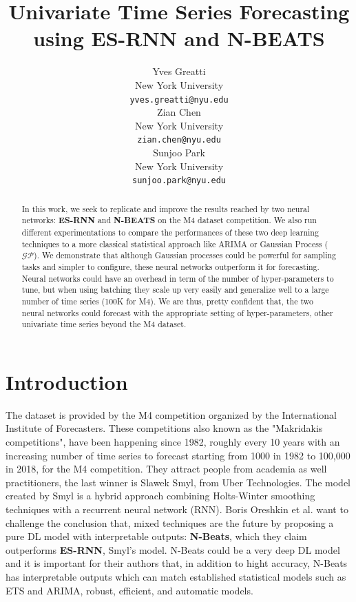 \documentclass{article}
\title{Univariate Time Series Forecasting using ES-RNN and N-BEATS}
\author{%
  Yves Greatti \\
  New York University\\
  \texttt{yves.greatti@nyu.edu} \\
   \And
    Zian Chen \\
    New York University\\
    \texttt{zian.chen@nyu.edu} \\
    \And 
   Sunjoo Park\\
    New York University\\
    \texttt{sunjoo.park@nyu.edu}
}
\begin{document}
\maketitle

\begin{abstract}
  In this work, we seek to replicate and improve the results reached by two neural networks: \textbf{ES-RNN} and \textbf{N-BEATS} on the M4 dataset competition.
  We also run different experimentations to compare the performances of these two deep learning techniques to a more classical statistical approach like ARIMA or Gaussian Process ($\mathcal{GP}$).
  We demonstrate that although Gaussian processes could be powerful for sampling tasks and simpler to configure, these neural networks outperform it for forecasting. Neural networks could have an overhead in term of the number of hyper-parameters to tune, but when using batching they scale up very easily and generalize well to a large number of time series (100K for M4). We are thus, pretty confident that, the two neural networks could forecast with the appropriate setting of hyper-parameters, other univariate time series beyond the M4 dataset.  
  
 \end{abstract}

\section{Introduction}
\label{Introduction}

The dataset is provided by the M4 competition organized by the International Institute of Forecasters. 
These competitions also known as the "Makridakis competitions", have been happening since 1982, roughly every 10 years with an increasing number of time series to forecast
starting from 1000 in 1982  to 100,000 in 2018, for the M4 competition. They attract people from academia as well practitioners, the last winner is Slawek Smyl, from Uber Technologies. 
The model created by Smyl is a hybrid approach combining Holts-Winter smoothing
techniques with a recurrent neural network (RNN). Boris 
Oreshkin et al. want to challenge the conclusion that, mixed techniques are the future by proposing a pure DL model with interpretable outputs: \textbf{N-Beats}, which they claim outperforms \textbf{ES-RNN}, Smyl's model. 
N-Beats could be a very deep DL model and it is important for their authors that, in addition to hight accuracy, N-Beats has interpretable outputs which can match established statistical models such as ETS and ARIMA, robust, efficient, and automatic models. 
\end{document}
